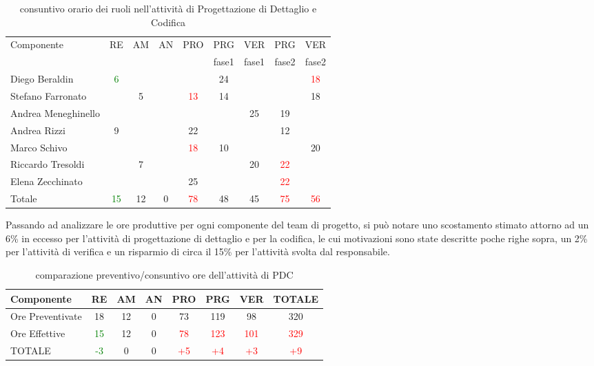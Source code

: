 \begin{table}[h!]
\centering
\begin{tabular}{|l|c|c|c|c|c|c|c|c|}
\hline
\multirow{2}{*}{Componente}& RE& AM& AN& PRO& PRG&VER& PRG& VER \\
					      &    &     &      &        & fase1&fase1&fase2&fase2\\
\hline
Diego Beraldin & \textcolor{green}{6}& & & & 24& & & \textcolor{red}{18}\\
Stefano Farronato & & 5& & \textcolor{red}{13}&14 & & & 18\\
Andrea Meneghinello & & & & & & 25& 19& \\
Andrea Rizzi & 9& & & 22& & & 12& \\
Marco Schivo & & & &\textcolor{red}{18}& 10& & & 20\\
Riccardo Tresoldi & & 7& & & & 20& \textcolor{red}{22}& \\
Elena Zecchinato & & & & 25& & & \textcolor{red}{22}& \\
\hline
Totale & \textcolor{green}{15}& 12& 0& \textcolor{red}{78}& 48& 45& \textcolor{red}{75}& \textcolor{red}{56}\\
\hline
\end{tabular}
\caption{consuntivo orario dei ruoli nell'attività di Progettazione di Dettaglio e Codifica}\label{tab:consruolipdc}
\end{table}

Passando ad analizzare le ore produttive per ogni componente del team di progetto, si può notare uno scostamento stimato attorno ad un 6\% in eccesso per l'attività di progettazione di dettaglio e per la codifica, le cui motivazioni sono state descritte poche righe sopra, un 2\% per l'attività di verifica e un risparmio di circa il 15\% per l'attività svolta dal responsabile. 
\begin{table}[H]
\centering
\begin{tabular}{|l|c c c c c c|c|}
\hline
Componente		& RE&   AM&   AN&  PRO& PRG& VER & TOTALE\\
\hline
Ore Preventivate	& 18&    12&   0&  73& 119&    98  & 320\\
Ore Effettive       	& \textcolor{green}{15} &   12&   0&  \textcolor{red}{78}& \textcolor{red}{123}&     \textcolor{red}{101} & \textcolor{red}{329}\\
\hline
TOTALE			& \textcolor{green}{-3}&    0&    0&    \textcolor{red}{+5}&\textcolor{red}{+4}& \textcolor{red}{+3}& \textcolor{red}{+9}\\
\hline
\end{tabular}
\caption{comparazione preventivo/consuntivo ore dell'attività di PDC}\label{tab:consorepdc}
\end{table}


